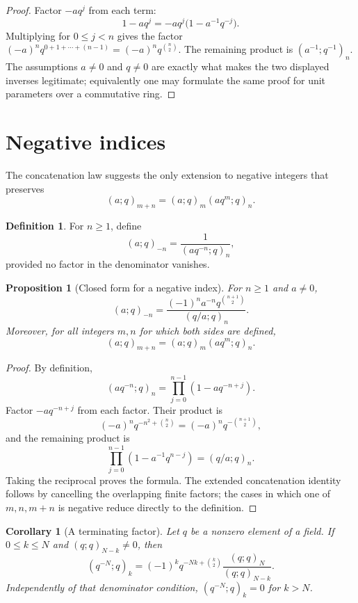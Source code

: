 \documentclass[11pt,a4paper,oneside,openany]{book}
\newtheorem{proposition}[proposition]{Proposition}
\newtheorem{corollary}[corollary]{Corollary}
\theoremstyle{definition}
\newtheorem{definition}[definition]{Definition}
\theoremstyle{remark}
\begin{document}
\begin{proof}
Factor $-aq^j$ from each term:
\[
 1-aq^j=-aq^j\bigl(1-a^{-1}q^{-j}\bigr).
\]
Multiplying for $0\le j<n$ gives the factor
\(
 (-a)^nq^{0+1+\cdots+(n-1)}=(-a)^nq^{\binom n2}.
\)
The remaining product is $(a^{-1};q^{-1})_n$.  The assumptions
$a\ne0$ and $q\ne0$ are exactly what makes the two displayed inverses
legitimate; equivalently one may formulate the same proof for unit parameters
over a commutative ring.
\end{proof}

\section{Negative indices}

The concatenation law suggests the only extension to negative integers that preserves
\[
 (a;q)_{m+n}=(a;q)_m(aq^m;q)_n.
\]

\begin{definition}
For $n\ge1$, define
\[
 (a;q)_{-n}=\frac{1}{(aq^{-n};q)_n},
\]
provided no factor in the denominator vanishes.
\end{definition}

\begin{proposition}[Closed form for a negative index]\label{prop:negative-index}
For $n\ge1$ and $a\ne0$,
\[
 (a;q)_{-n}
 =\frac{(-1)^n a^{-n}q^{\binom{n+1}{2}}}{(q/a;q)_n}.
\]
Moreover, for all integers $m,n$ for which both sides are defined,
\[
 (a;q)_{m+n}=(a;q)_m(aq^m;q)_n.
\]
\end{proposition}

\begin{proof}
By definition,
\[
 (aq^{-n};q)_n=\prod_{j=0}^{n-1}(1-aq^{-n+j}).
\]
Factor $-a q^{-n+j}$ from each factor.  Their product is
\[
 (-a)^nq^{-n^2+\binom n2}=(-a)^nq^{-\binom{n+1}{2}},
\]
and the remaining product is
\[
 \prod_{j=0}^{n-1}(1-a^{-1}q^{n-j})=(q/a;q)_n.
\]
Taking the reciprocal proves the formula.  The extended concatenation identity follows by cancelling the overlapping finite factors; the cases in which one of $m,n,m+n$ is negative reduce directly to the definition.
\end{proof}

\begin{corollary}[A terminating factor]\label{cor:qminusN}
Let $q$ be a nonzero element of a field.  If $0\le k\le N$ and
$(q;q)_{N-k}\ne0$, then
\[
 (q^{-N};q)_k=(-1)^kq^{-Nk+\binom k2}
 \frac{(q;q)_N}{(q;q)_{N-k}}.
\]
Independently of that denominator condition, $(q^{-N};q)_k=0$ for $k>N$.
\end{corollary}
\end{document}
